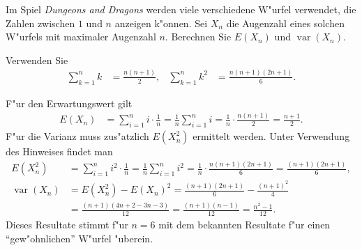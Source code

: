 Im Spiel {\it Dungeons and Dragons} werden viele verschiedene W"urfel
verwendet, die Zahlen zwischen $1$ und $n$ anzeigen k"onnen. Sei $X_n$ 
die Augenzahl eines solchen W"urfels mit maximaler Augenzahl $n$. 
Berechnen Sie $E(X_n)$ und $\operatorname{var}(X_n)$.

\begin{hinweis}
Verwenden Sie
\begin{align*}
\sum_{k=1}^nk&=\frac{n(n+1)}2,&
\sum_{k=1}^nk^2&=\frac{n(n+1)(2n+1)}6.
\end{align*}
\end{hinweis}

\begin{loesung}
F"ur den Erwartungswert gilt
\begin{align*}
E(X_n)&=\sum_{i=1}^n i\cdot \frac1n=\frac1n\sum_{i=1}^ni
=\frac1n\cdot\frac{n(n+1)}2=\frac{n+1}2.
\end{align*}
F"ur die Varianz muss zus"atzlich $E(X_n^2)$ ermittelt werden.
Unter Verwendung des Hinweises findet man
\begin{align*}
E(X_n^2)&=\sum_{i=1}^n i^2\cdot \frac1n=\frac1n\sum_{i=1}^ni^2
=\frac1n\cdot\frac{n(n+1)(2n+1)}6
=\frac{(n+1)(2n+1)}6,\\
\operatorname{var}(X_n)&=E(X_n^2)-E(X_n)^2
=\frac{(n+1)(2n+1)}6-\frac{(n+1)^2}4\\
&=\frac{(n+1)(4n + 2 - 3n - 3)}{12}
=\frac{(n+1)(n - 1)}{12}
=\frac{n^2-1}{12}.
\end{align*}
Dieses Resultate stimmt f"ur $n=6$ mit dem bekannten Resultate f"ur einen
``gew"ohnlichen'' W"urfel "uberein.
\end{loesung}
